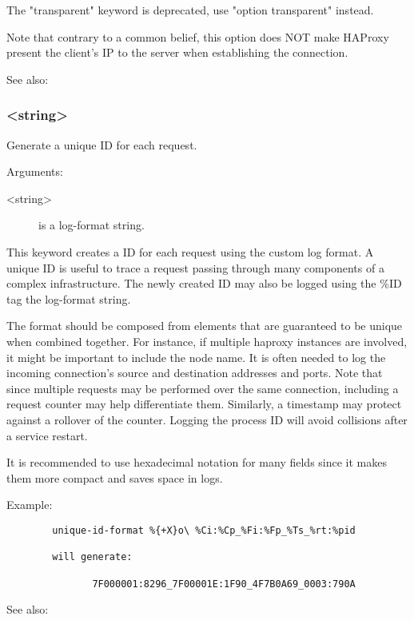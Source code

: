   The "transparent" keyword is deprecated, use "option transparent" instead.

  Note that contrary to a common belief, this option does NOT make HAProxy
  present the client's IP to the server when establishing the connection.


See also: 

\subsubsection[unique-id-format]{ <string>}

  Generate a unique ID for each request.


  Arguments:
  \begin{description}
  \item[<string>] is a log-format string.
  \end{description}

  This keyword creates a ID for each request using the custom log format. A
  unique ID is useful to trace a request passing through many components of
  a complex infrastructure. The newly created ID may also be logged using the
  \%ID tag the log-format string.

  The format should be composed from elements that are guaranteed to be
  unique when combined together. For instance, if multiple haproxy instances
  are involved, it might be important to include the node name. It is often
  needed to log the incoming connection's source and destination addresses
  and ports. Note that since multiple requests may be performed over the same
  connection, including a request counter may help differentiate them.
  Similarly, a timestamp may protect against a rollover of the counter.
  Logging the process ID will avoid collisions after a service restart.

  It is recommended to use hexadecimal notation for many fields since it
  makes them more compact and saves space in logs.

  Example:
  \begin{verbatim}
        unique-id-format %{+X}o\ %Ci:%Cp_%Fi:%Fp_%Ts_%rt:%pid

        will generate:

               7F000001:8296_7F00001E:1F90_4F7B0A69_0003:790A
  \end{verbatim}


See also: 

